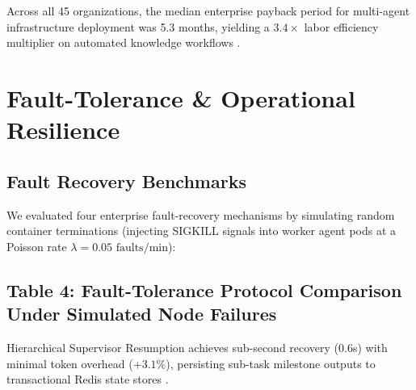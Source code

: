 \documentclass[10pt,twocolumn,letterpaper]{article}
\begin{document}
Across all 45 organizations, the median enterprise payback period for multi-agent infrastructure deployment was 5.3 months, yielding a $3.4\times$ labor efficiency multiplier on automated knowledge workflows \cite{crossref_10_1108_jeim_12_2025_1269}.




\section{Fault-Tolerance \& Operational Resilience}



\subsection{Fault Recovery Benchmarks}


We evaluated four enterprise fault-recovery mechanisms by simulating random container terminations (injecting SIGKILL signals into worker agent pods at a Poisson rate $\lambda = 0.05\text{ faults/min}$):


\subsection{Table 4: Fault-Tolerance Protocol Comparison Under Simulated Node Failures}
\begin{table}[htbp]
\centering
{}
\end{table}

Hierarchical Supervisor Resumption achieves sub-second recovery ($0.6$s) with minimal token overhead ($+3.1\%$), persisting sub-task milestone outputs to transactional Redis state stores \cite{crossref_10_1145_3689096_3689462}.
\end{document}
